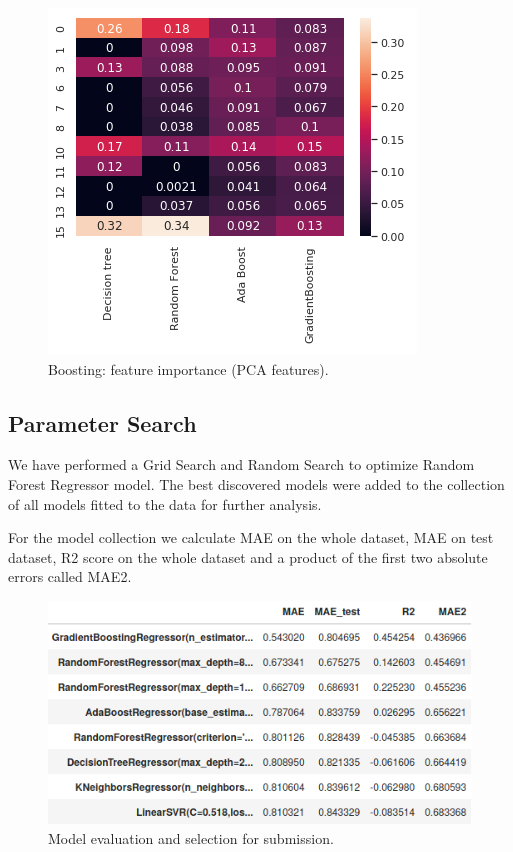 \documentclass[sigconf]{acmart}
\begin{document}
\begin{figure}[h]
    \includegraphics[width=\linewidth]{6-feature-boosting.png}
    \centering
    \caption{Boosting: feature importance (PCA features).}
\end{figure}

\subsection{Parameter Search}
We have performed a Grid Search and Random Search to optimize Random Forest Regressor model.
The best discovered models were added to the collection of all models fitted to the data for further analysis.

For the model collection we calculate MAE on the whole dataset, MAE on test dataset, R2 score on the whole dataset and a product of the first two absolute errors called MAE2.

\begin{figure}[h]
    \includegraphics[width=\linewidth]{7-model-eval.png}
    \centering
    \caption{Model evaluation and selection for submission.}
\end{figure}
\end{document}
